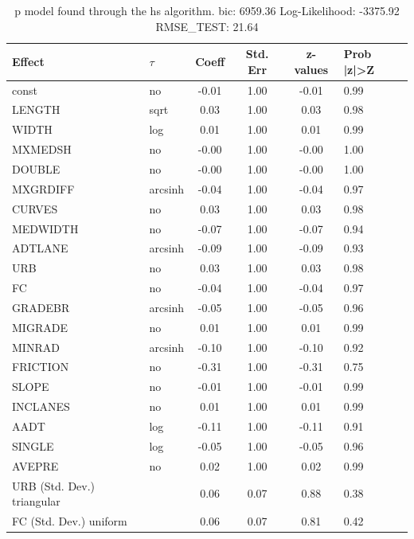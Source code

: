 \begin{table}
	\caption{p model found through the hs algorithm. bic: 6959.36 Log-Likelihood: -3375.92 RMSE_TEST: 21.64}
	\begin{center}
		\begin{tabular}{|l|l|c|c|c|l|}
			\hline
			Effect & $\tau$ & Coeff & Std. Err & z-values & Prob |z|>Z \\
			\hline
			const & no & -0.01 & 1.00 & -0.01 & 0.99 \\
			\hline
			LENGTH & sqrt & 0.03 & 1.00 & 0.03 & 0.98 \\
			\hline
			WIDTH & log & 0.01 & 1.00 & 0.01 & 0.99 \\
			\hline
			MXMEDSH & no & -0.00 & 1.00 & -0.00 & 1.00 \\
			\hline
			DOUBLE & no & -0.00 & 1.00 & -0.00 & 1.00 \\
			\hline
			MXGRDIFF & arcsinh & -0.04 & 1.00 & -0.04 & 0.97 \\
			\hline
			CURVES & no & 0.03 & 1.00 & 0.03 & 0.98 \\
			\hline
			MEDWIDTH & no & -0.07 & 1.00 & -0.07 & 0.94 \\
			\hline
			ADTLANE & arcsinh & -0.09 & 1.00 & -0.09 & 0.93 \\
			\hline
			URB & no & 0.03 & 1.00 & 0.03 & 0.98 \\
			\hline
			FC & no & -0.04 & 1.00 & -0.04 & 0.97 \\
			\hline
			GRADEBR & arcsinh & -0.05 & 1.00 & -0.05 & 0.96 \\
			\hline
			MIGRADE & no & 0.01 & 1.00 & 0.01 & 0.99 \\
			\hline
			MINRAD & arcsinh & -0.10 & 1.00 & -0.10 & 0.92 \\
			\hline
			FRICTION & no & -0.31 & 1.00 & -0.31 & 0.75 \\
			\hline
			SLOPE & no & -0.01 & 1.00 & -0.01 & 0.99 \\
			\hline
			INCLANES & no & 0.01 & 1.00 & 0.01 & 0.99 \\
			\hline
			AADT & log & -0.11 & 1.00 & -0.11 & 0.91 \\
			\hline
			SINGLE & log & -0.05 & 1.00 & -0.05 & 0.96 \\
			\hline
			AVEPRE & no & 0.02 & 1.00 & 0.02 & 0.99 \\
			\hline
			URB (Std. Dev.) triangular &  & 0.06 & 0.07 & 0.88 & 0.38 \\
			\hline
			FC (Std. Dev.) uniform &  & 0.06 & 0.07 & 0.81 & 0.42 \\
			\hline

\end{tabular}
\end{center}
\end{table}
